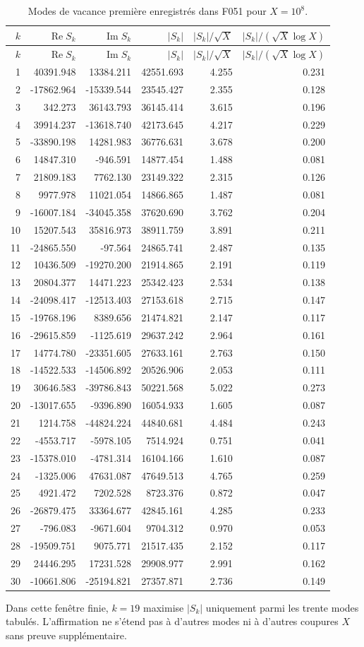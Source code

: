 \begingroup
\scriptsize
\setlength{\tabcolsep}{3.1pt}
\renewcommand{\arraystretch}{1.08}
\begin{longtable}{@{}r r r r r r@{}}
\caption{Modes de vacance première enregistrés dans F051 pour \(X=10^8\).}
\label{v:f051:tab:all-modes}\\
\toprule
\(k\)&\(\operatorname{Re}S_k\)&\(\operatorname{Im}S_k\)&\(|S_k|\)&\(|S_k|/\sqrt X\)&\(|S_k|/(\sqrt X\log X)\)\\
\midrule
\endfirsthead
\toprule
\(k\)&\(\operatorname{Re}S_k\)&\(\operatorname{Im}S_k\)&\(|S_k|\)&\(|S_k|/\sqrt X\)&\(|S_k|/(\sqrt X\log X)\)\\
\midrule
\endhead
1&40391.948&13384.211&42551.693&4.255&0.231\\
2&-17862.964&-15339.544&23545.427&2.355&0.128\\
3&342.273&36143.793&36145.414&3.615&0.196\\
4&39914.237&-13618.740&42173.645&4.217&0.229\\
5&-33890.198&14281.983&36776.631&3.678&0.200\\
6&14847.310&-946.591&14877.454&1.488&0.081\\
7&21809.183&7762.130&23149.322&2.315&0.126\\
8&9977.978&11021.054&14866.865&1.487&0.081\\
9&-16007.184&-34045.358&37620.690&3.762&0.204\\
10&15207.543&35816.973&38911.759&3.891&0.211\\
11&-24865.550&-97.564&24865.741&2.487&0.135\\
12&10436.509&-19270.200&21914.865&2.191&0.119\\
13&20804.377&14471.223&25342.423&2.534&0.138\\
14&-24098.417&-12513.403&27153.618&2.715&0.147\\
15&-19768.196&8389.656&21474.821&2.147&0.117\\
16&-29615.859&-1125.619&29637.242&2.964&0.161\\
17&14774.780&-23351.605&27633.161&2.763&0.150\\
18&-14522.533&-14506.892&20526.906&2.053&0.111\\
19&30646.583&-39786.843&50221.568&5.022&0.273\\
20&-13017.655&-9396.890&16054.933&1.605&0.087\\
21&1214.758&-44824.224&44840.681&4.484&0.243\\
22&-4553.717&-5978.105&7514.924&0.751&0.041\\
23&-15378.010&-4781.314&16104.166&1.610&0.087\\
24&-1325.006&47631.087&47649.513&4.765&0.259\\
25&4921.472&7202.528&8723.376&0.872&0.047\\
26&-26879.475&33364.677&42845.161&4.285&0.233\\
27&-796.083&-9671.604&9704.312&0.970&0.053\\
28&-19509.751&9075.771&21517.435&2.152&0.117\\
29&24446.295&17231.528&29908.977&2.991&0.162\\
30&-10661.806&-25194.821&27357.871&2.736&0.149\\
\bottomrule
\end{longtable}
\endgroup

Dans cette fenêtre finie, \(k=19\) maximise \(|S_k|\) uniquement parmi les
trente modes tabulés. L’affirmation ne s’étend pas à d’autres modes ni à d’autres
coupures \(X\) sans preuve supplémentaire.
